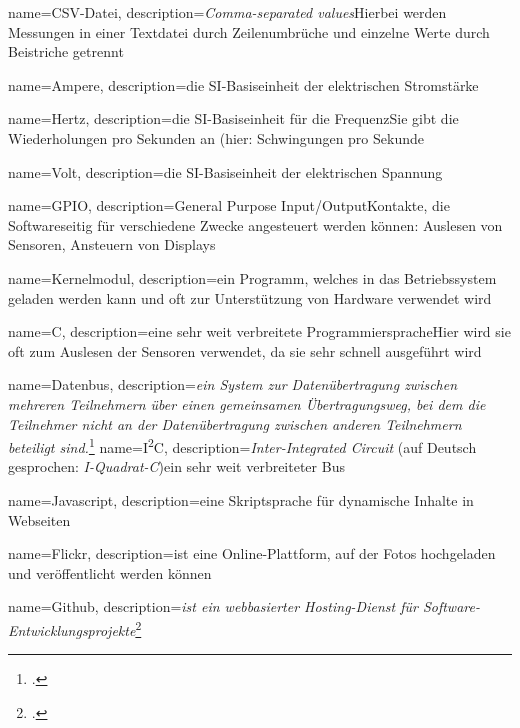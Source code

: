 {
  name=CSV-Datei,
  description={\textit{Comma-separated values}\newline Hierbei werden Messungen in einer Textdatei durch Zeilenumbrüche und einzelne Werte durch Beistriche getrennt}
}


{
  name=Ampere,
  description={die SI-Basiseinheit der elektrischen Stromstärke}
}

{
  name=Hertz,
  description={die SI-Basiseinheit für die Frequenz\newline Sie gibt die Wiederholungen pro Sekunden an (hier: Schwingungen pro Sekunde}
}

{
  name=Volt,
  description={die SI-Basiseinheit der elektrischen Spannung}
}

{
  name=GPIO,
  description={General Purpose Input/Output\newline Kontakte, die Softwareseitig für verschiedene Zwecke angesteuert werden können\newline \zB: Auslesen von Sensoren, Ansteuern von Displays}
}

{
  name=Kernelmodul,
  description={ein Programm, welches in das Betriebssystem geladen werden kann und oft zur Unterstützung von Hardware verwendet wird}
}

{
  name=C,
  description={eine sehr weit verbreitete Programmiersprache\newline Hier wird sie oft zum Auslesen der Sensoren verwendet, da sie sehr schnell ausgeführt wird}
}

{
  name=Datenbus,
  description={\textit{ein System zur Datenübertragung zwischen mehreren Teilnehmern über einen gemeinsamen Übertragungsweg, bei dem die Teilnehmer nicht an der Datenübertragung zwischen anderen Teilnehmern beteiligt sind.}\footcite{wiki:bus}}
}
{
  name=I\textsuperscript{2}C,
  description={\textit{Inter-Integrated Circuit} (auf Deutsch gesprochen: \textit{I-Quadrat-C})\newline ein sehr weit verbreiteter \gls{Bus}}
}


{
  name=Javascript,
  description={eine Skriptsprache für dynamische Inhalte in Webseiten}
}

{
  name=Flickr,
  description={ist eine Online-Plattform, auf der Fotos hochgeladen und veröffentlicht werden können}
}

{
  name=Github,
  description={\emph{ist ein webbasierter Hosting-Dienst für Software-Entwicklungsprojekte}\footcite{wiki:github}}
}
